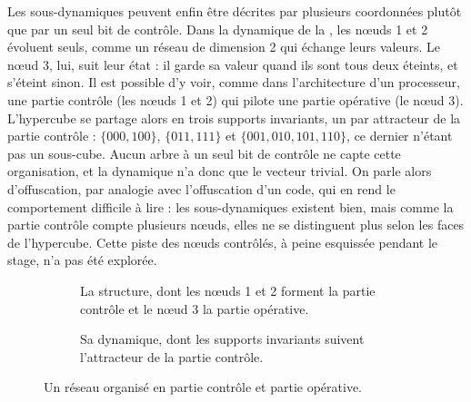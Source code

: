 \documentclass[12pt, a4paper]{article}
\begin{document}
Les sous-dynamiques peuvent enfin être décrites par plusieurs coordonnées plutôt que par un seul bit de contrôle.
Dans la dynamique de la , les nœuds 1 et 2 évoluent seuls, comme un réseau de dimension 2 qui échange leurs valeurs.
Le nœud 3, lui, suit leur état : il garde sa valeur quand ils sont tous deux éteints, et s'éteint sinon.
Il est possible d'y voir, comme dans l'architecture d'un processeur, une partie contrôle (les nœuds 1 et 2) qui pilote une partie opérative (le nœud 3).
L'hypercube se partage alors en trois supports invariants, un par attracteur de la partie contrôle : $\{000, 100\}$, $\{011, 111\}$ et $\{001, 010, 101, 110\}$, ce dernier n'étant pas un sous-cube.
Aucun arbre à un seul bit de contrôle ne capte cette organisation, et la dynamique n'a donc que le vecteur trivial.
On parle alors d'offuscation, par analogie avec l'offuscation d'un code, qui en rend le comportement difficile à lire : les sous-dynamiques existent bien, mais comme la partie contrôle compte plusieurs nœuds, elles ne se distinguent plus selon les faces de l'hypercube.
Cette piste des nœuds contrôlés, à peine esquissée pendant le stage, n'a pas été explorée.

\begin{figure}[H]
    \centering
    \begin{subfigure}{0.48\linewidth}
        \centering
        \caption{La structure, dont les nœuds 1 et 2 forment la partie contrôle et le nœud 3 la partie opérative.}
    \end{subfigure}
    \hfill
    \begin{subfigure}{0.48\linewidth}
        \centering
        \caption{Sa dynamique, dont les supports invariants suivent l'attracteur de la partie contrôle.}
    \end{subfigure}
    \caption{Un réseau organisé en partie contrôle et partie opérative.}
    \label{fig:pcpo-3d}
\end{figure}
\end{document}
